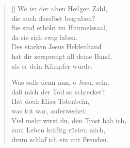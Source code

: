 \begin{multicols}{2}
\begin{verse}[\versewidth]
 Wo ist der alten Heilgen Zahl,\\
die auch daselbst begraben?\\
Sie sind erhöht im Himmelssaal,\\
da sie sich ewig laben.\\
Des starken Jesus Heldenhand\\
hat dir zersprengt all deine Band,\\
als er dein Kämpfer wurde.

 Was solls denn nun, o Jesu, sein,\\
daß mich der Tod so schrecket?\\
Hat doch Elisa Totenbein,\\
was tot war, auferwecket:\\
Viel mehr wirst du, den Trost hab ich,\\
zum Leben kräftig rüsten mich,\\
drum schlaf ich ein mit Freuden.
   
\end{verse}
\end{multicols}
